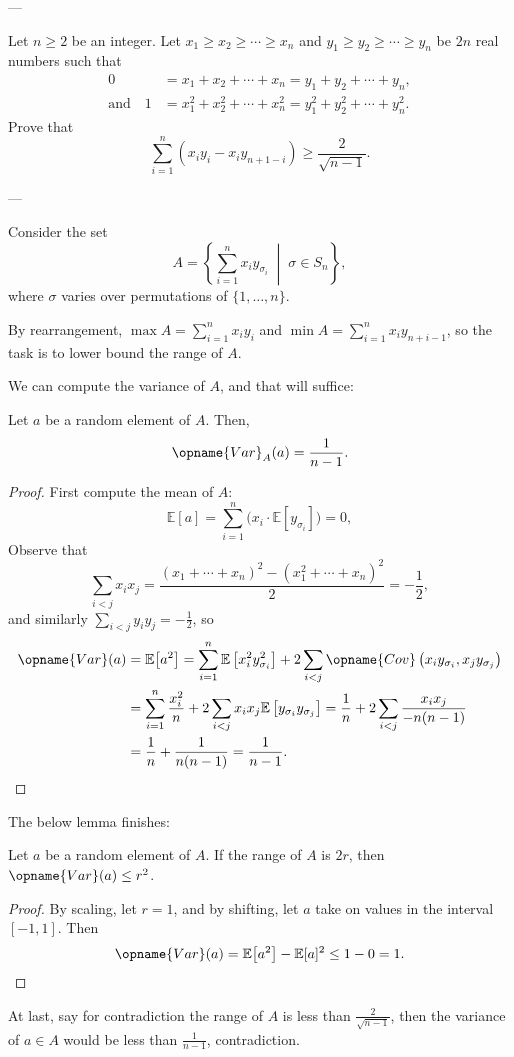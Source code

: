 
---

Let $n\ge2$ be an integer. Let $x_1\ge x_2\ge\cdots\ge x_n$ and $y_1\ge y_2\ge\cdots\ge y_n$ be $2n$ real numbers such that
\begin{align*}
    0&=x_1+x_2+\cdots+x_n=y_1+y_2+\cdots+y_n,\\
    \text{and}\quad1&=x_1^2+x_2^2+\cdots+x_n^2=y_1^2+y_2^2+\cdots+y_n^2.
\end{align*}
Prove that
\[\sum_{i=1}^n\left(x_iy_i-x_iy_{n+1-i}\right)\ge\frac2{\sqrt{n-1}}.\]

---

Consider the set
\[A=\left\{\sum_{i=1}^nx_iy_{\sigma_i}\;\middle\vert\;\sigma\in S_n\right\},\]
where $\sigma$ varies over permutations of $\{1,\ldots,n\}$.

By rearrangement, $\max A=\sum_{i=1}^nx_iy_i$ and $\min A=\sum_{i=1}^nx_iy_{n+i-1}$, so the task is to lower bound the range of $A$.

We can compute the variance of $A$, and that will suffice:
\begin{claim*}
    Let $a$ be a random element of $A$. Then,
    \[\opname{Var}_{A}(a)=\frac1{n-1}.\]
\end{claim*}
\begin{proof}
    First compute the mean of $A$:
    \[\mathbb E[a]=\sum_{i=1}^n\Big(x_i\cdot\mathbb E\left[y_{\sigma_i}\right]\Big)=0,\]
    Observe that
    \[\sum_{i<j}x_ix_j=\frac{(x_1+\cdots+x_n)^2-(x_1^2+\cdots+x_n)^2}2=-\frac12,\]
    and similarly $\sum_{i<j}y_iy_j=-\frac12$, so
    \begin{align*}
        \opname{Var}(a)&=\mathbb E\big[a^2\big]
        =\sum_{i=1}^n\mathbb E\left[x_i^2y_{\sigma_i}^2\right]+2\sum_{i<j}\opname{Cov}\left(x_iy_{\sigma_i},x_jy_{\sigma_j}\right)\\
        &=\sum_{i=1}^n\frac{x_i^2}n+2\sum_{i<j}x_ix_j\mathbb E\left[y_{\sigma_i}y_{\sigma_j}\right]
        =\frac1n+2\sum_{i<j}\frac{x_ix_j}{-n(n-1)}\\
        &=\frac1n+\frac1{n(n-1)}=\frac1{n-1}.
    \end{align*}
\end{proof}

The below lemma finishes:
\begin{lemma*}
    Let $a$ be a random element of $A$. If the range of $A$ is $2r$, then $\opname{Var}(a)\le r^2$.
\end{lemma*}
\begin{proof}
    By scaling, let $r=1$, and by shifting, let $a$ take on values in the interval $[-1,1]$. Then
    \[\opname{Var}(a)=\mathbb E\big[a^2\big]-\mathbb E[a]^2\le1-0=1.\]
\end{proof}

At last, say for contradiction the range of $A$ is less than $\frac2{\sqrt{n-1}}$, then the variance of $a\in A$ would be less than $\frac1{n-1}$, contradiction.

